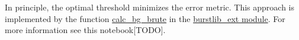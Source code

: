 In principle, the optimal threshold minimizes
the error metric. This approach is implemented by the function
\href{http://fretbursts.readthedocs.org/en/latest/plugins.html#fretbursts.burstlib\_ext.calc\_bg\_brute}{calc\_bg\_brute}
in the
\href{http://fretbursts.readthedocs.org/en/latest/plugins.html}{burstlib\_ext module}.
For more information see this notebook[TODO].
